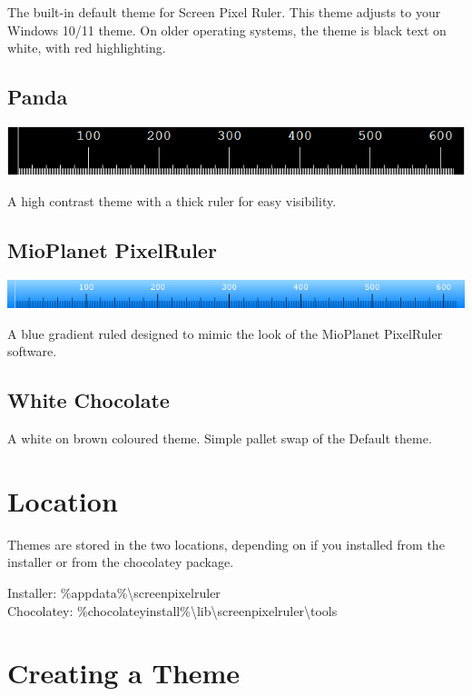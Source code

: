 \documentclass[
]{book}
\begin{document}
The built-in default theme for Screen Pixel Ruler.
This theme adjusts to your Windows 10/11 theme.
On older operating systems, the theme is black text on white, with red highlighting.

\subsection{Panda}\label{panda}

\includegraphics{images/theme-panda.png}

A high contrast theme with a thick ruler for easy visibility.

\subsection{MioPlanet PixelRuler}\label{mioplanet-pixelruler}

\includegraphics{images/theme-mioplanet.png}

A blue gradient ruled designed to mimic the look of the MioPlanet PixelRuler software.

\subsection{White Chocolate}\label{white-chocolate}

A white on brown coloured theme.
Simple pallet swap of the Default theme.

\section{Location}\label{location-1}

Themes are stored in the two locations, depending on if you installed from the installer or from the chocolatey package.

Installer: \%appdata\%\textbackslash screenpixelruler\\
Chocolatey: \%chocolateyinstall\%\textbackslash lib\textbackslash screenpixelruler\textbackslash tools

\section{Creating a Theme}\label{creating-a-theme}
\end{document}
